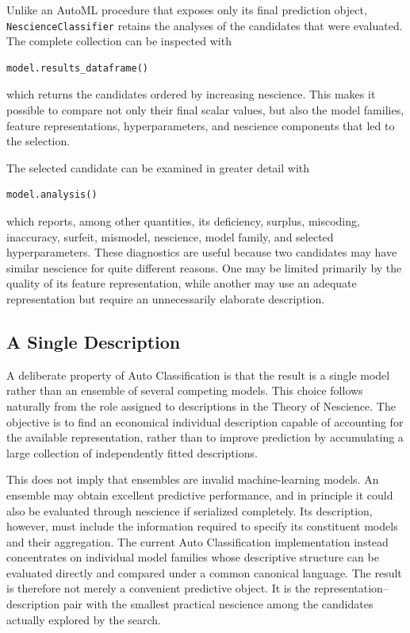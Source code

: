 Unlike an AutoML procedure that exposes only its final prediction object, \texttt{NescienceClassifier} retains the analyses of the candidates that were evaluated. The complete collection can be inspected with

\begin{sourcecode}
{\scriptsize
\begin{verbatim}
model.results_dataframe()
\end{verbatim}}
\end{sourcecode}

which returns the candidates ordered by increasing nescience. This makes it possible to compare not only their final scalar values, but also the model families, feature representations, hyperparameters, and nescience components that led to the selection.

The selected candidate can be examined in greater detail with

\begin{sourcecode}
{\scriptsize
\begin{verbatim}
model.analysis()
\end{verbatim}}
\end{sourcecode}

which reports, among other quantities, its deficiency, surplus, miscoding, inaccuracy, surfeit, mismodel, nescience, model family, and selected hyperparameters. These diagnostics are useful because two candidates may have similar nescience
for quite different reasons. One may be limited primarily by the quality of its feature representation, while another may use an adequate representation but require an unnecessarily elaborate description.


\subsection*{A Single Description}

A deliberate property of Auto Classification is that the result is a single model rather than an ensemble of several competing models. This choice follows naturally from the role assigned to descriptions in the Theory of Nescience. The objective is to find an economical individual description capable of accounting for the available representation, rather than to improve prediction by accumulating a large collection of independently fitted descriptions.

This does not imply that ensembles are invalid machine-learning models. An ensemble may obtain excellent predictive performance, and in principle it could also be evaluated through nescience if serialized completely. Its description, however, must include the information required to specify its constituent models and their aggregation. The current Auto Classification implementation instead concentrates on individual model families whose descriptive structure can be evaluated directly and compared under a common canonical language. The result is therefore not merely a convenient predictive object. It is the representation--description pair with the smallest practical nescience among the candidates actually explored by the search.

